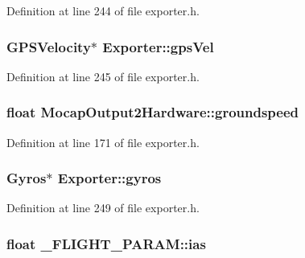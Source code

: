 \-Definition at line 244 of file exporter.\-h.

\hypertarget{group___mo_cap_plugin_ga75de3c84f1e0fec7aec493cb1a27b9a8}{
\subsubsection[{gps\-Vel}]{\setlength{\rightskip}{0pt plus 5cm}\-G\-P\-S\-Velocity$\ast$ {\bf \-Exporter\-::gps\-Vel}}}\label{group___mo_cap_plugin_ga75de3c84f1e0fec7aec493cb1a27b9a8}


\-Definition at line 245 of file exporter.\-h.

\hypertarget{group___mo_cap_plugin_gab0735b3db4133ae25e01a4ee6dc3347f}{
\subsubsection[{groundspeed}]{\setlength{\rightskip}{0pt plus 5cm}float {\bf \-Mocap\-Output2\-Hardware\-::groundspeed}}}\label{group___mo_cap_plugin_gab0735b3db4133ae25e01a4ee6dc3347f}


\-Definition at line 171 of file exporter.\-h.

\hypertarget{group___mo_cap_plugin_ga2b6042b4adabe6985d92cc22f33cfc9a}{
\subsubsection[{gyros}]{\setlength{\rightskip}{0pt plus 5cm}\-Gyros$\ast$ {\bf \-Exporter\-::gyros}}}\label{group___mo_cap_plugin_ga2b6042b4adabe6985d92cc22f33cfc9a}


\-Definition at line 249 of file exporter.\-h.

\hypertarget{group___mo_cap_plugin_ga30e6260b59e9997c3b1bec5bc9347ec3}{
\subsubsection[{ias}]{\setlength{\rightskip}{0pt plus 5cm}float {\bf \-\_\-\-F\-L\-I\-G\-H\-T\-\_\-\-P\-A\-R\-A\-M\-::ias}}}\label{group___mo_cap_plugin_ga30e6260b59e9997c3b1bec5bc9347ec3}


